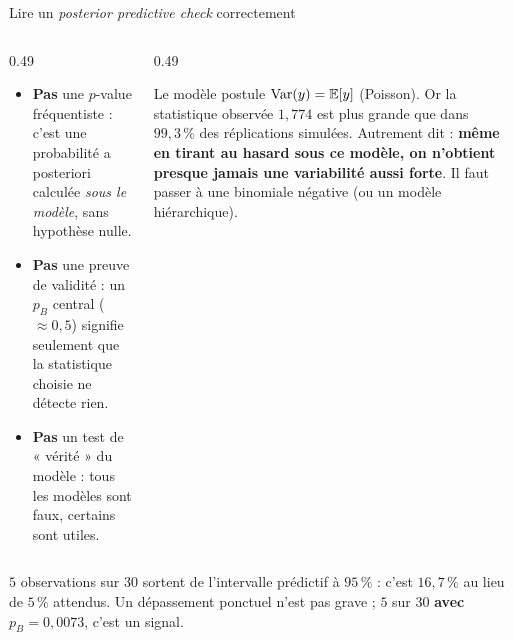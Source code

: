 \begin{frame}{Lire un \textit{posterior predictive check} correctement}
\begin{columns}[t]
\begin{column}{0.49\textwidth}
\begin{kbox}
\begin{itemize}
  \item \textbf{Pas} une $p$-value fréquentiste : c'est une probabilité a
        posteriori calculée \emph{sous le modèle}, sans hypothèse nulle.
  \item \textbf{Pas} une preuve de validité : un $p_B$ central ($\approx 0{,}5$)
        signifie seulement que la statistique choisie ne détecte rien.
  \item \textbf{Pas} un test de « vérité » du modèle : tous les modèles sont faux,
        certains sont utiles.
\end{itemize}
\end{kbox}
\end{column}
\begin{column}{0.49\textwidth}
\begin{ebox}
Le modèle postule $\mathrm{Var}(y) = \mathbb{E}[y]$ (Poisson). Or la statistique observée
$1{,}774$ est plus grande que dans $99{,}3\,\%$ des réplications simulées.
Autrement dit : \textbf{même en tirant au hasard sous ce modèle, on n'obtient
presque jamais une variabilité aussi forte}. Il faut passer à une
binomiale négative (ou un modèle hiérarchique).
\end{ebox}
\end{column}
\end{columns}
\vspace{1mm}
\begin{wbox}
$5$ observations sur $30$ sortent de l'intervalle prédictif à $95\,\%$ : c'est
$16{,}7\,\%$ au lieu de $5\,\%$ attendus. Un dépassement ponctuel n'est pas
grave ; $5$ sur $30$ \textbf{avec} $p_B = 0{,}0073$, c'est un signal.
\end{wbox}
\end{frame}

